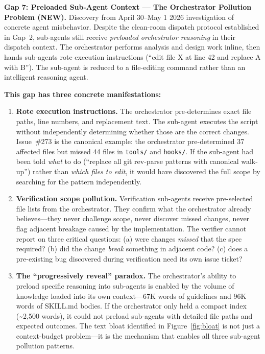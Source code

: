\documentclass[11pt,a4paper]{article}
\begin{document}
\begin{gapbox}
\textbf{Gap 7: Preloaded Sub-Agent Context --- The Orchestrator Pollution Problem (NEW).}  Discovery from April 30--May 1 2026 investigation of concrete agent misbehavior.  Despite the clean-room dispatch protocol established in Gap~2, sub-agents still receive \emph{preloaded orchestrator reasoning} in their dispatch context.  The orchestrator performs analysis and design work inline, then hands sub-agents rote execution instructions (``edit file X at line 42 and replace A with B'').  The sub-agent is reduced to a file-editing command rather than an intelligent reasoning agent.

\textbf{This gap has three concrete manifestations:}

\begin{enumerate}[leftmargin=*]
  \item \textbf{Rote execution instructions.}  The orchestrator pre-determines exact file paths, line numbers, and replacement text.  The sub-agent executes the script without independently determining whether those are the correct changes.  Issue~\#273 is the canonical example: the orchestrator pre-determined 37 affected files but missed 44 files in \texttt{tools/} and \texttt{hooks/}.  If the sub-agent had been told \emph{what} to do (``replace all git rev-parse patterns with canonical walk-up'') rather than \emph{which files to edit}, it would have discovered the full scope by searching for the pattern independently.

  \item \textbf{Verification scope pollution.}  Verification sub-agents receive pre-selected file lists from the orchestrator.  They confirm what the orchestrator already believes---they never challenge scope, never discover missed changes, never flag adjacent breakage caused by the implementation.  The verifier cannot report on three critical questions: (a) were changes \emph{missed} that the spec required?  (b) did the change \emph{break} something in adjacent code?  (c) does a pre-existing bug discovered during verification need its own issue ticket?

  \item \textbf{The ``progressively reveal'' paradox.}  The orchestrator's ability to preload specific reasoning into sub-agents is enabled by the volume of knowledge loaded into its own context---67K words of guidelines and 96K words of SKILL.md bodies.  If the orchestrator only held a compact index (\textasciitilde{}2,500 words), it could not preload sub-agents with detailed file paths and expected outcomes.  The text bloat identified in Figure~\ref{fig:bloat} is not just a context-budget problem---it is the mechanism that enables all three sub-agent pollution patterns.


\end{enumerate}
\end{gapbox}
\end{document}
